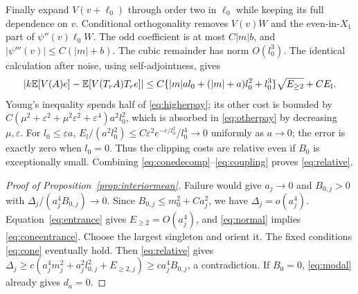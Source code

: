 Finally expand $V(v+\ell_0)$ through order two in $\ell_0$ while
keeping its full dependence on $v$. Conditional orthogonality removes
$V(v)W$ and the even-in-$X_1$ part of $\psi''(v)\ell_0 W$.
The odd coefficient is at most $C|m|b$, and
$|\psi'''(v)|\le C(|m|+b)$. The cubic remainder has norm $O(l_0^3)$.
The identical calculation after noise, using self-adjointness, gives
\begin{equation}\label{eq:coupling}
 |k\mathbb E[V(A)e]-\mathbb E[V(T_rA)T_re]|
 \le C\{|m|a l_0+(|m|+a)l_0^2+l_0^3\}\sqrt{E_{\ge2}}+CE_l.
\end{equation}
Young's inequality spends half of \eqref{eq:higherpay}; its other cost
is bounded by
$C(\mu^2+\varepsilon^2+\mu^2\varepsilon^2+\varepsilon^4)a^2l_0^2$,
which is absorbed in \eqref{eq:otherpay} by decreasing $\mu,\varepsilon$.
For $l_0\le\varepsilon a$,
$E_l/(a^2l_0^2)\le C\varepsilon^2e^{-c/l_0^2}/l_0^4\to0$
uniformly as $a\to0$; the error is exactly zero when $l_0=0$.
Thus the clipping costs are relative even if $B_0$ is exceptionally
small. Combining \eqref{eq:conedecomp}--\eqref{eq:coupling} proves
\eqref{eq:relative}.

\begin{proof}[Proof of Proposition~\ref{prop:interiormean}]
Failure would give $a_j\to0$ and $B_{0,j}>0$ with
$\Delta_j/(a_j^4B_{0,j})\to0$. Since $B_{0,j}\le m_0^2+Ca_j^2$,
we have $\Delta_j=o(a_j^4)$. Equation~\eqref{eq:entrance} gives
$E_{\ge2}=O(a_j^4)$, and \eqref{eq:normal} implies
\eqref{eq:coneentrance}. Choose the largest singleton and orient it.
The fixed conditions \eqref{eq:cone} eventually hold. Then
\eqref{eq:relative} gives
$\Delta_j\ge c(a_j^4m_j^2+a_j^2l_{0,j}^2+E_{\ge2,j})
\ge ca_j^4B_{0,j}$, a contradiction. If $B_0=0$, \eqref{eq:modal}
already gives $d_a=0$.
\end{proof}
